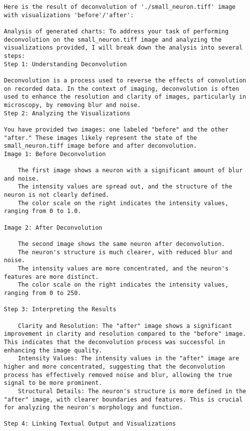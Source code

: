 \begin{lstlisting}
Here is the result of deconvolution of './small_neuron.tiff' image with visualizations 'before'/'after':

Analysis of generated charts: To address your task of performing deconvolution on the small_neuron.tiff image and analyzing the visualizations provided, I will break down the analysis into several steps:
Step 1: Understanding Deconvolution

Deconvolution is a process used to reverse the effects of convolution on recorded data. In the context of imaging, deconvolution is often used to enhance the resolution and clarity of images, particularly in microscopy, by removing blur and noise.
Step 2: Analyzing the Visualizations

You have provided two images: one labeled "before" and the other "after." These images likely represent the state of the small_neuron.tiff image before and after deconvolution.
Image 1: Before Deconvolution

    The first image shows a neuron with a significant amount of blur and noise.
    The intensity values are spread out, and the structure of the neuron is not clearly defined.
    The color scale on the right indicates the intensity values, ranging from 0 to 1.0.

Image 2: After Deconvolution

    The second image shows the same neuron after deconvolution.
    The neuron's structure is much clearer, with reduced blur and noise.
    The intensity values are more concentrated, and the neuron's features are more distinct.
    The color scale on the right indicates the intensity values, ranging from 0 to 250.

Step 3: Interpreting the Results

    Clarity and Resolution: The "after" image shows a significant improvement in clarity and resolution compared to the "before" image. This indicates that the deconvolution process was successful in enhancing the image quality.
    Intensity Values: The intensity values in the "after" image are higher and more concentrated, suggesting that the deconvolution process has effectively removed noise and blur, allowing the true signal to be more prominent.
    Structural Details: The neuron's structure is more defined in the "after" image, with clearer boundaries and features. This is crucial for analyzing the neuron's morphology and function.

Step 4: Linking Textual Output and Visualizations


\end{lstlisting}
